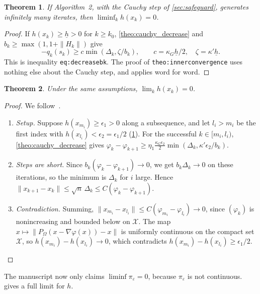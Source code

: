 \documentclass[11pt,a4paper]{article}
\numberwithin{equation}{section}
\theoremstyle{plain}
\newtheorem{theorem}{Theorem}
\theoremstyle{definition}
\theoremstyle{remark}
\newcommand{\kG}{\kappa_G}
\newcommand{\calX}{\mathcal{X}}
\newcommand{\codeus}{\textunderscore\allowbreak}
\newcommand{\code}[1]{{\let\_\codeus\texttt{#1}}}
\begin{document}
\begin{theorem}\label{theo:liminf}
If Algorithm~2, with the Cauchy step of \cref{sec:safeguard}, generates infinitely many
iterates, then $\liminf_k h(x_k)=0$.
\end{theorem}

\begin{proof}
If $h(x_k)\ge\underline h>0$ for $k\ge k_0$, \cref{theo:cauchy_decrease} and
$b_k\ge\max(1,1+\|H_k\|)$ give
\[
  -q_k(s_k)\ge c\min(\Delta_k,\zeta/b_k),\qquad c=\kG\underline h/2,\quad\zeta=\kappa'\underline h.
\]
This is inequality \code{eq:\allowbreak decrease\_bk}. The proof of \code{theo:\allowbreak inner\_convergence} uses
nothing else about the Cauchy step, and applies word for word.
\end{proof}

\begin{theorem}\label{theo:limit}
Under the same assumptions, $\lim_kh(x_k)=0$.
\end{theorem}

\begin{proof}
We follow~\cite[Theorem~11]{CGT88}.
\begin{enumerate}[1.]
\item \emph{Setup.} Suppose $h(x_{m_i})\ge\epsilon_1>0$ along a subsequence, and let $l_i>m_i$
  be the first index with $h(x_{l_i})<\epsilon_2=\epsilon_1/2$ (\cref{theo:liminf}). For the
  successful $k\in[m_i,l_i)$, \cref{theo:cauchy_decrease} gives
  $\varphi_k-\varphi_{k+1}\ge\eta_1\frac{\kG\epsilon_2}2\min(\Delta_k,\kappa'\epsilon_2/b_k)$.
\item \emph{Steps are short.} Since $b_k(\varphi_k-\varphi_{k+1})\to0$, we get
  $b_k\Delta_k\to0$ on these iterations, so the minimum is $\Delta_k$ for $i$ large. Hence
  $\|x_{k+1}-x_k\|\le\sqrt n\,\Delta_k\le C(\varphi_k-\varphi_{k+1})$.
\item \emph{Contradiction.} Summing, $\|x_{m_i}-x_{l_i}\|\le C(\varphi_{m_i}-\varphi_{l_i})\to0$,
  since $(\varphi_k)$ is nonincreasing and bounded below on $\calX$. The map
  $x\mapsto\|P_\Omega(x-\nabla\varphi(x))-x\|$ is uniformly continuous on the compact set
  $\calX$, so $h(x_{m_i})-h(x_{l_i})\to0$, which contradicts
  $h(x_{m_i})-h(x_{l_i})\ge\epsilon_1/2$.\qedhere
\end{enumerate}
\end{proof}

The manuscript now only claims $\liminf\pi_\varepsilon=0$, because $\pi_\varepsilon$ is not
continuous.  gives a full limit for $h$.
\end{document}
